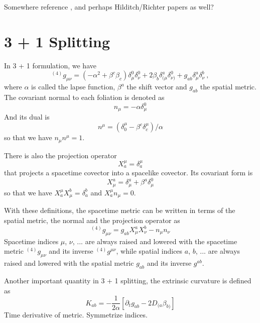 \documentclass[letterpaper,nofootinbib,prd,amsmath,onecolumn]{revtex4-1}
\begin{document}
Somewhere reference \cite{Brown:2008cca}, and perhaps Hilditch/Richter papers as well?
\section{3 + 1 Splitting}\label{3+1}
In 3 + 1 formulation, we have
\begin{equation*}
	{}^{(4)}g_{\mu\nu} = (-\alpha^2 + \beta^{c}\beta_{c})\delta_\mu^0\delta_\nu^0 
	+ 2\beta_{b}\delta_{(\mu}^a\delta_{\nu)}^0 + g_{ab} \delta^a_\mu \delta^b_\nu \ ,
\end{equation*}
where $\alpha$ is called the lapse function, $\beta^{a}$ the shift vector and $g_{ab}$ the spatial metric. The covariant normal to each foliation is denoted as
\begin{equation}\label{normal covector}
n_{\mu} = -\alpha\delta^{0}_{\mu}
\end{equation}
 And its dual is
\begin{equation}\label{normal vector}
n^{\mu} = (\delta^{\mu}_{0} - \beta^{c}\delta^{\mu}_{c})/\alpha
\end{equation}
so that we have $n_{\mu}n^{\mu} = 1$. 

There is also the projection operator
\begin{equation}\label{projection 1}
X^{\mu}_{a} = \delta^{\mu}_{a}
\end{equation}
that projects a spacetime covector into a spacelike covector. Its covariant form is
\begin{equation}\label{projection 2}
X^{a}_{\mu} = \delta^{a}_{\mu} + \beta^{a}\delta^{0}_{\mu}
\end{equation}
so that we have $X^{\mu}_{a}X^{b}_{\mu} = \delta^{b}_{a}$ and $X^{\mu}_{a}n_{\mu} = 0$. 

With these definitions, the spacetime metric can be written in terms of the spatial metric, the normal and the projection operator as
\begin{equation}\label{spacetime metric 3 + 1}
^{(4)}g_{\mu\nu} = g_{ab}X^{a}_{\mu}X^{b}_{\nu} - n_{\mu}n_{\nu}
\end{equation}
Spacetime indices $\mu$, $\nu$, ... are always raised and lowered with the spacetime metric $^{(4)}g_{\mu\nu}$ and its inverse $^{(4)}g^{\mu\nu}$, while spatial indices $a$, $b$, ... are always raised and lowered with the spatial metric $g_{ab}$ and its inverse $g^{ab}$. 

Another important quantity in 3 + 1 splitting, the extrinsic curvature is defined as
\begin{equation}\label{extrinsic}
K_{ab} = - \frac{1}{2\alpha}\left[\partial_{t}g_{ab} - 2D_{(a}\beta_{b)}\right]
\end{equation}
Time derivative of metric. Symmetrize indices. 
\end{document}
